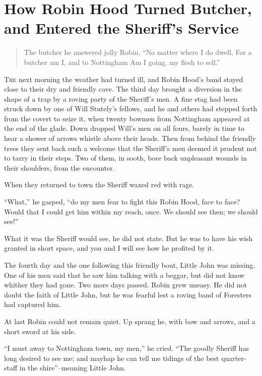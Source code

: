 \chapter{How Robin Hood Turned Butcher, and Entered the Sheriff’s Service}

\begin{quote}
The butcher he answered jolly Robin,
“No matter where I do dwell,
For a butcher am I, and to Nottingham
Am I going, my flesh to sell.”
\end{quote}

\lettrine{T}{he} next morning the weather had turned ill, and Robin Hood's band
stayed close to their dry and friendly cave. The third day brought a
diversion in the shape of a trap by a roving party of the Sheriff's men.
A fine stag had been struck down by one of Will Stutely's fellows, and
he and others had stepped forth from the covert to seize it, when twenty
bowmen from Nottingham appeared at the end of the glade. Down dropped
Will's men on all fours, barely in time to hear a shower of arrows
whistle above their heads. Then from behind the friendly trees they sent
back such a welcome that the Sheriff's men deemed it prudent not to
tarry in their steps. Two of them, in sooth, bore back unpleasant wounds
in their shoulders, from the encounter.

When they returned to town the Sheriff waxed red with rage.

``What,'' he gasped, ``do my men fear to fight this Robin Hood, face to
face? Would that I could get him within my reach, once. We should see
then; we should see!''

What it was the Sheriff would see, he did not state. But he was to have
his wish granted in short space, and you and I will see how he profited
by it.

The fourth day and the one following this friendly bout, Little John was
missing. One of his men said that he saw him talking with a beggar, but
did not know whither they had gone. Two more days passed. Robin grew
uneasy. He did not doubt the faith of Little John, but he was fearful
lest a roving band of Foresters had captured him.

At last Robin could not remain quiet. Up sprang he, with bow and arrows,
and a short sword at his side.

``I must away to Nottingham town, my men,'' he cried. ``The goodly
Sheriff has long desired to see me; and mayhap he can tell me tidings of
the best quarter-staff in the shire''--meaning Little John.


